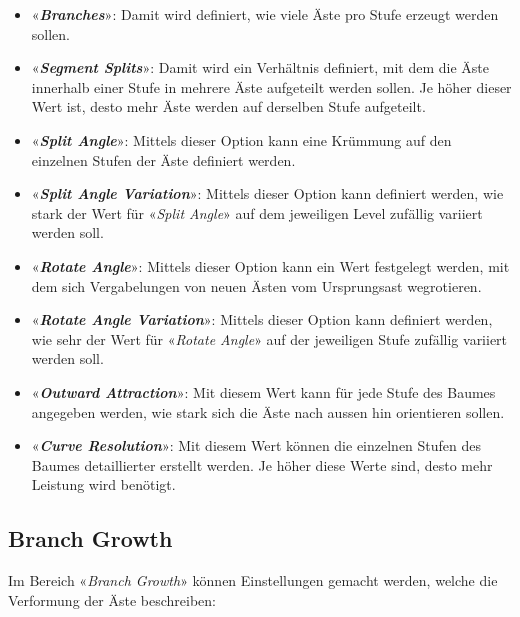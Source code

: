 \documentclass[
]{book}
\providecommand{\tightlist}{%
  \setlength{\itemsep}{0pt}\setlength{\parskip}{0pt}}\usepackage{longtable,booktabs,array}
\let\oldmarginnote\marginnote
\renewcommand{\marginnote}[1]{%
  \oldmarginnote{{\footnotesize\selectfont #1}}%
}
\begin{document}
\begin{itemize}
\tightlist
\item
  «\textbf{\emph{Branches}}»: Damit wird definiert, wie viele Äste pro
  Stufe erzeugt werden sollen.
\item
  «\textbf{\emph{Segment Splits}}»: Damit wird ein Verhältnis definiert,
  mit dem die Äste innerhalb einer Stufe in mehrere Äste aufgeteilt
  werden sollen. Je höher dieser Wert ist, desto mehr Äste werden auf
  derselben Stufe aufgeteilt.
\item
  «\textbf{\emph{Split Angle}}»: Mittels dieser Option kann eine
  Krümmung auf den einzelnen Stufen der Äste definiert werden.
\item
  «\textbf{\emph{Split Angle Variation}}»: Mittels dieser Option kann
  definiert werden, wie stark der Wert für «\emph{Split Angle}» auf dem
  jeweiligen Level zufällig variiert werden soll.
\item
  «\textbf{\emph{Rotate Angle}}»: Mittels dieser Option kann ein Wert
  festgelegt werden, mit dem sich Vergabelungen von neuen Ästen vom
  Ursprungsast wegrotieren.
\item
  «\textbf{\emph{Rotate Angle Variation}}»: Mittels dieser Option kann
  definiert werden, wie sehr der Wert für «\emph{Rotate Angle}» auf der
  jeweiligen Stufe zufällig variiert werden soll.
\item
  «\textbf{\emph{Outward Attraction}}»: Mit diesem Wert kann für jede
  Stufe des Baumes angegeben werden, wie stark sich die Äste nach aussen
  hin orientieren sollen.
\item
  «\textbf{\emph{Curve Resolution}}»: Mit diesem Wert können die
  einzelnen Stufen des Baumes detaillierter erstellt werden. Je höher
  diese Werte sind, desto mehr Leistung wird benötigt.
\end{itemize}

\subsection{Branch Growth}\label{branch-growth}

\marginnote{Branch-Growth-Einstellungen}

Im Bereich «\emph{Branch Growth}» können Einstellungen gemacht werden,
welche die Verformung der Äste beschreiben:
\end{document}
